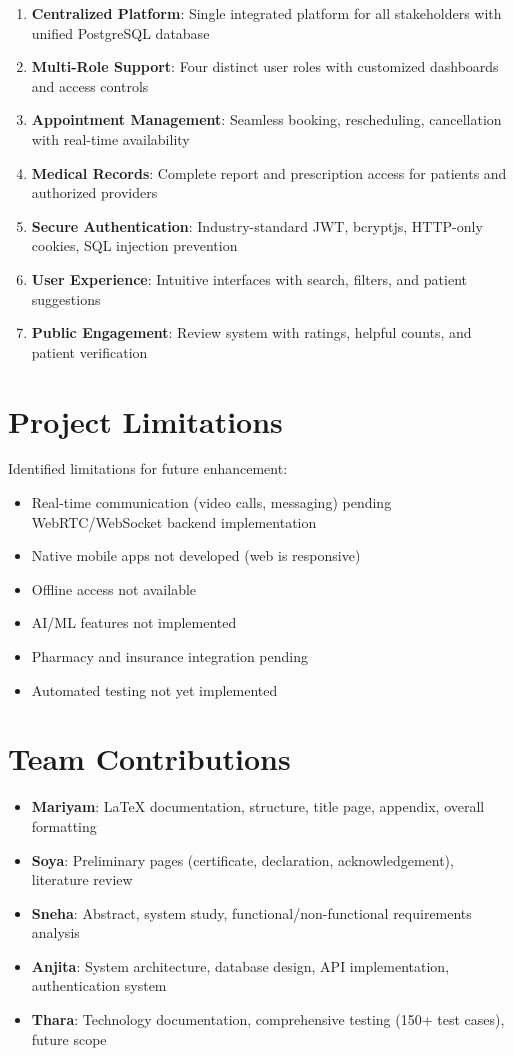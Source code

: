 \begin{enumerate}
    \item \textbf{Centralized Platform}: Single integrated platform for all stakeholders with unified PostgreSQL database
    \item \textbf{Multi-Role Support}: Four distinct user roles with customized dashboards and access controls
    \item \textbf{Appointment Management}: Seamless booking, rescheduling, cancellation with real-time availability
    \item \textbf{Medical Records}: Complete report and prescription access for patients and authorized providers
    \item \textbf{Secure Authentication}: Industry-standard JWT, bcryptjs, HTTP-only cookies, SQL injection prevention
    \item \textbf{User Experience}: Intuitive interfaces with search, filters, and patient suggestions
    \item \textbf{Public Engagement}: Review system with ratings, helpful counts, and patient verification
\end{enumerate}

\section{Project Limitations}

Identified limitations for future enhancement:

\begin{itemize}
    \item Real-time communication (video calls, messaging) pending WebRTC/WebSocket backend implementation
    \item Native mobile apps not developed (web is responsive)
    \item Offline access not available
    \item AI/ML features not implemented
    \item Pharmacy and insurance integration pending
    \item Automated testing not yet implemented
\end{itemize}

\section{Team Contributions}

\begin{itemize}
    \item \textbf{Mariyam}: LaTeX documentation, structure, title page, appendix, overall formatting
    \item \textbf{Soya}: Preliminary pages (certificate, declaration, acknowledgement), literature review
    \item \textbf{Sneha}: Abstract, system study, functional/non-functional requirements analysis
    \item \textbf{Anjita}: System architecture, database design, API implementation, authentication system
    \item \textbf{Thara}: Technology documentation, comprehensive testing (150+ test cases), future scope
\end{itemize}

